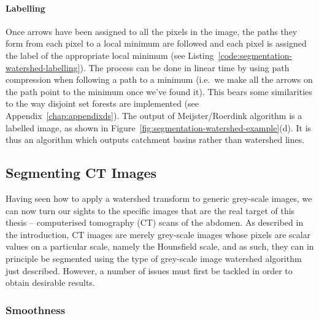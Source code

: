 \paragraph{Labelling}

Once arrows have been assigned to all the pixels in the image, the paths they form from each pixel to a local minimum are followed and each pixel is assigned the label of the appropriate local minimum (see Listing~\ref{code:segmentation-watershed-labelling}). The process can be done in linear time by using path compression when following a path to a minimum (i.e.~we make all the arrows on the path point to the minimum once we've found it). This bears some similarities to the way disjoint set forests are implemented (see Appendix~\ref{chap:appendixds}). The output of  Meijster/Roerdink algorithm is a labelled image, as shown in Figure~\ref{fig:segmentation-watershed-example}(d). It is thus an algorithm which outputs catchment basins rather than watershed lines.


\subsection{Segmenting CT Images}
\label{subsec:segmentation-watershed-ct}


Having seen how to apply a watershed transform to generic grey-scale images, we can now turn our sights to the specific images that are the real target of this thesis -- computerised tomography (CT) scans of the abdomen. As described in the introduction, CT images are merely grey-scale images whose pixels are scalar values on a particular scale, namely the Hounsfield scale, and as such, they can in principle be segmented using the type of grey-scale image watershed algorithm just described. However, a number of issues must first be tackled in order to obtain desirable results.

\subsubsection{Smoothness}
\label{subsubsec:segmentation-watershed-ct-smoothness}

